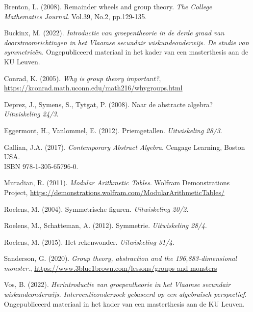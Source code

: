 \begin{bronnen}
   	\item Brenton, L. (2008). Remainder wheels and group theory. \emph{The College Mathematics Journal}. Vol.39, No.2, pp.129-135.

    \item Buckinx, M. (2022). \emph{Introductie van groepentheorie in de derde graad van doorstroomrichtingen in het Vlaamse secundair wiskundeonderwijs. De studie van symmetrieën.} Ongepubliceerd materiaal in het kader van een masterthesis aan de KU Leuven.
    
    \item Conrad, K. (2005). \emph{Why is group theory important?}, \url{https://kconrad.math.uconn.edu/math216/whygroups.html}
    
    \item Deprez, J., Symens, S., Tytgat, P. (2008). Naar de abstracte algebra? \emph{Uitwiskeling 24/3}.
    
    \item Eggermont, H., Vanlommel, E. (2012). Priemgetallen. \emph{Uitwiskeling 28/3}.
    
    \item Gallian, J.A. (2017). \emph{Contemporary Abstract Algebra}. Cengage Learning, Boston USA.\\ ISBN 978-1-305-65796-0.

    \item Muradian, R. (2011). \emph{Modular Arithmetic Tables}. Wolfram Demonstrations Project, \url{https://demonstrations.wolfram.com/ModularArithmeticTables/}

    \item Roelens, M. (2004). Symmetrische figuren. \emph{Uitwiskeling 20/2.}
    
    \item Roelens, M., Schatteman, A. (2012). Symmetrie. \emph{Uitwiskeling 28/4.}

	\item Roelens, M. (2015). Het rekenwonder. \emph{Uitwiskeling 31/4}.

    \item Sanderson, G. (2020). \emph{Group theory, abstraction and the 196,883-dimensional monster.}, \url{https://www.3blue1brown.com/lessons/groups-and-monsters}
    
    \item Vos, B. (2022). \emph{Herintroductie van groepentheorie in het Vlaamse secundair wiskundeonderwijs. Interventieonderzoek gebaseerd op een algebraïsch perspectief}. Ongepubliceerd materiaal in het kader van een masterthesis aan de KU Leuven.
    
    
 
	
	


\end{bronnen}

